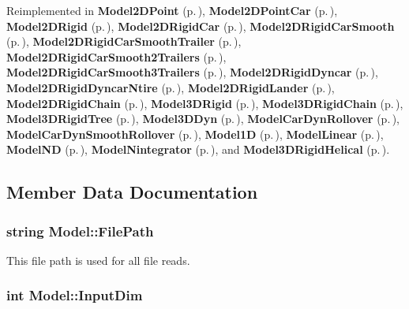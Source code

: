 Reimplemented in {\bf Model2DPoint} {\rm (p.\,\pageref{classModel2DPoint_a3})}, {\bf Model2DPoint\-Car} {\rm (p.\,\pageref{classModel2DPointCar_a3})}, {\bf Model2DRigid} {\rm (p.\,\pageref{classModel2DRigid_a3})}, {\bf Model2DRigid\-Car} {\rm (p.\,\pageref{classModel2DRigidCar_a2})}, {\bf Model2DRigid\-Car\-Smooth} {\rm (p.\,\pageref{classModel2DRigidCarSmooth_a2})}, {\bf Model2DRigid\-Car\-Smooth\-Trailer} {\rm (p.\,\pageref{classModel2DRigidCarSmoothTrailer_a2})}, {\bf Model2DRigid\-Car\-Smooth2Trailers} {\rm (p.\,\pageref{classModel2DRigidCarSmooth2Trailers_a2})}, {\bf Model2DRigid\-Car\-Smooth3Trailers} {\rm (p.\,\pageref{classModel2DRigidCarSmooth3Trailers_a2})}, {\bf Model2DRigid\-Dyncar} {\rm (p.\,\pageref{classModel2DRigidDyncar_a4})}, {\bf Model2DRigid\-Dyncar\-Ntire} {\rm (p.\,\pageref{classModel2DRigidDyncarNtire_a2})}, {\bf Model2DRigid\-Lander} {\rm (p.\,\pageref{classModel2DRigidLander_a4})}, {\bf Model2DRigid\-Chain} {\rm (p.\,\pageref{classModel2DRigidChain_a3})}, {\bf Model3DRigid} {\rm (p.\,\pageref{classModel3DRigid_a3})}, {\bf Model3DRigid\-Chain} {\rm (p.\,\pageref{classModel3DRigidChain_a2})}, {\bf Model3DRigid\-Tree} {\rm (p.\,\pageref{classModel3DRigidTree_a2})}, {\bf Model3DDyn} {\rm (p.\,\pageref{classModel3DDyn_a2})}, {\bf Model\-Car\-Dyn\-Rollover} {\rm (p.\,\pageref{classModelCarDynRollover_a3})}, {\bf Model\-Car\-Dyn\-Smooth\-Rollover} {\rm (p.\,\pageref{classModelCarDynSmoothRollover_a2})}, {\bf Model1D} {\rm (p.\,\pageref{classModel1D_a4})}, {\bf Model\-Linear} {\rm (p.\,\pageref{classModelLinear_a4})}, {\bf Model\-ND} {\rm (p.\,\pageref{classModelND_a4})}, {\bf Model\-Nintegrator} {\rm (p.\,\pageref{classModelNintegrator_a4})}, and {\bf Model3DRigid\-Helical} {\rm (p.\,\pageref{classModel3DRigidHelical_a2})}.

\subsection{Member Data Documentation}
\subsubsection{\setlength{\rightskip}{0pt plus 5cm}string Model::File\-Path}\label{classModel_m0}


This file path is used for all file reads.

\subsubsection{\setlength{\rightskip}{0pt plus 5cm}int Model::Input\-Dim}\label{classModel_m6}


